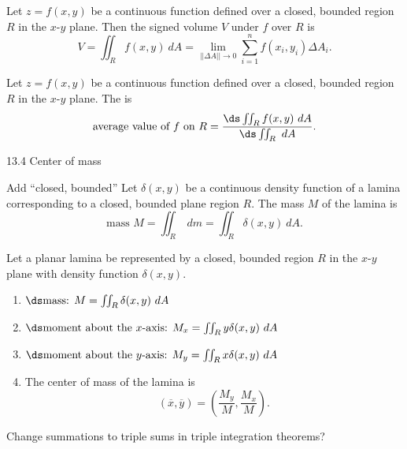 \documentclass{article}
\begin{document}
{Let $z=f(x,y)$ be a continuous function defined over a closed, bounded region $R$ in the $x$-$y$ plane. Then the signed volume $V$ under $f$ over $R$ is
$$V = \iint_R f(x,y)\ dA = \lim_{||\Delta A||\to 0}\sum_{i=1}^n f(x_i,y_i)\Delta A_i.$$
}

{Let $z=f(x,y)$ be a continuous function defined over a closed, bounded region $R$ in the $x$-$y$ plane. The  is 
$$\text{average value of $f$ on $R$} = \frac{\ds \iint_R f(x,y)\ dA}{\ds\iint_R \ dA}.$$
}

13.4 Center of mass

Add ``closed, bounded''
{Let $\delta(x,y)$ be a continuous density function of a lamina corresponding to a closed, bounded  plane region $R$. The mass $M$ of the lamina is
$$\text{mass } M = \iint_R\ dm = \iint_R \delta(x,y)\ dA.$$
}

{Let a planar lamina be represented by a closed, bounded region $R$ in the $x$-$y$ plane with density function $\delta(x,y)$. 
\begin{enumerate}
	\item $\ds \text{mass: } M = \iint_R\delta(x,y)\ dA$
	\item	$\ds \text{moment about the $x$-axis: } M_x = \iint_Ry\delta(x,y)\ dA$
	\item	$\ds \text{moment about the $y$-axis: } M_y = \iint_Rx\delta(x,y)\ dA$
	\item The center of mass  of the lamina is
	$$(\overline{x},\overline{y}) = \left(\frac{M_y}{M},\frac{M_x}M\right).$$
\end{enumerate}
}

Change summations to triple sums in triple integration theorems?
\end{document}
